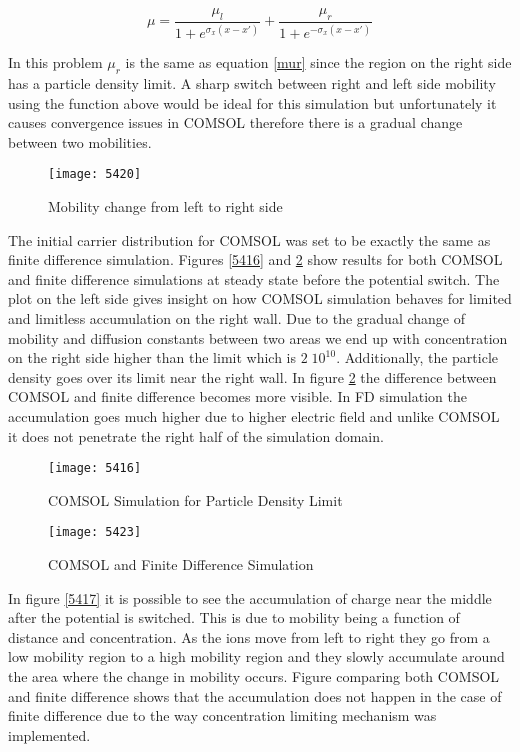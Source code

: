 \begin{equation}
\mu=\frac{\mu_{l}}{1+e^{\sigma_x(x-x')}}+\frac{\mu_{r}}{1+e^{-\sigma_x(x-x')}}
\end{equation}

In this problem $\mu_r$ is the same as equation \ref{mur} since the region on the right side has a particle density limit. A sharp switch between right and left side mobility using the function above would be ideal for this simulation but unfortunately it causes convergence issues in COMSOL therefore there is a gradual change between two mobilities. 

\begin{figure}[!htp]
\centering
\texttt{[image: 5420]}
\caption{Mobility change from left to right side} 
\label{5420}
\end{figure}

The initial carrier distribution for COMSOL was set to be exactly the same as finite difference simulation. Figures \ref{5416} and \ref{5423} show results for both COMSOL and finite difference simulations at steady state before the potential switch. The plot on the left side gives insight on how COMSOL simulation behaves for limited and limitless accumulation on the right wall. Due to the gradual change of mobility and diffusion constants between two areas we end up with concentration on the right side higher than the limit which is $2 \; 10^{10}$. Additionally, the particle density goes over its limit near the right wall. In figure \ref{5423} the difference between COMSOL and finite difference becomes more visible. In FD simulation the accumulation goes much higher due to higher electric field and unlike COMSOL it does not penetrate the right half of the simulation domain. 

\begin{figure}[ht]
\centering
\begin{minipage}[b]{0.45\linewidth}
\texttt{[image: 5416]}
\caption{COMSOL Simulation for Particle Density Limit}
\label{5416}
\end{minipage}
\quad
\begin{minipage}[b]{0.45\linewidth}
\texttt{[image: 5423]}
\caption{COMSOL and Finite Difference Simulation}
\label{5423}
\end{minipage}
\end{figure}


In figure \ref{5417} it is possible to see the accumulation of charge near the middle after the potential is switched. This is due to mobility being a function of distance and concentration. As the ions move from left to right they go from a low mobility region to a high mobility region and they slowly accumulate around the area where the change in mobility occurs. Figure comparing both COMSOL and finite difference shows that the accumulation does not happen in the case of finite difference due to the way concentration limiting mechanism was implemented.

